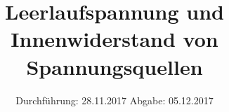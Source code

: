 

\subject{Versuch 301}
\title{Leerlaufspannung und Innenwiderstand von Spannungsquellen}
\date{%
  Durchführung: 28.11.2017
  \hspace{3em}
  Abgabe: 05.12.2017
}



\maketitle
\thispagestyle{empty}
\tableofcontents
\newpage






\printbibliography{}


